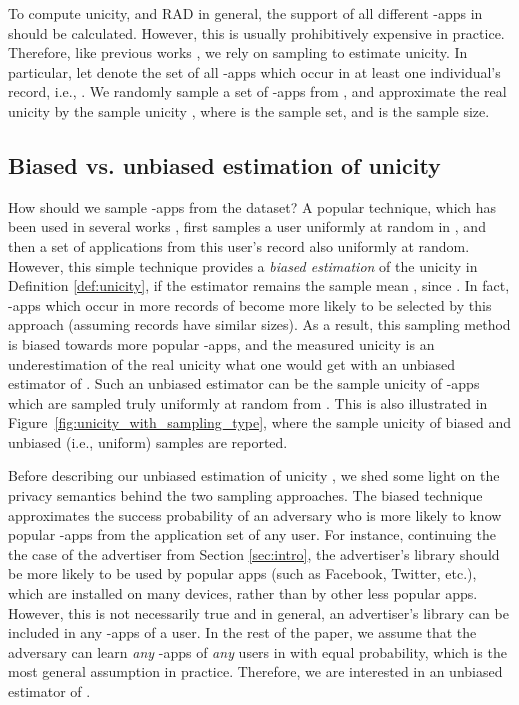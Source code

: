 \documentclass{acm_proc_article-sp}
\theoremstyle{plain}
\theoremstyle{plain}
\theoremstyle{plain}
\theoremstyle{plain}
\theoremstyle{plain}
\theoremstyle{plain}
\begin{document}
To compute unicity, and RAD in general, the support of all different -apps in  should be calculated. 
However, this is usually prohibitively expensive in practice.
Therefore, like previous works \cite{Science15, Nature13}, we rely on sampling to estimate unicity. 
In particular, let  denote the set of all -apps which occur in at least one individual's record, i.e., .
We randomly sample a set  of -apps from , and approximate the real unicity  by the sample unicity , where  is the sample set, and  is the sample size.

\subsection{Biased vs. unbiased estimation of unicity}
\label{sec:biased}
How should we sample -apps from the dataset? A popular technique, which has been used in several works \cite{Science15, Nature13},  first samples a user uniformly at random in , and then a set of  applications from this user's record also uniformly at random. However, this simple technique provides a \emph{biased estimation} of the unicity in Definition \ref{def:unicity}, if the estimator remains the sample mean , since .  
In fact, -apps which occur in more records of  become more likely to be selected by this approach (assuming records have similar sizes). 
As a result, this sampling method is biased towards more popular -apps, and the measured unicity is an underestimation of the real unicity  what one would get with an unbiased estimator of . Such an unbiased estimator can be the sample unicity  of -apps which are sampled truly uniformly at random from . 
This is also illustrated in Figure~\ref{fig:unicity_with_sampling_type}, where the sample unicity of biased and unbiased (i.e., uniform) samples are reported.


Before describing our unbiased estimation of unicity , we shed some light on the privacy semantics behind the two sampling approaches.  
The biased technique approximates the success probability of an adversary who is more likely to know popular -apps from the application set of any user. 
For instance, continuing the the case of the advertiser from Section \ref{sec:intro}, the advertiser's library should be more likely to be used by popular apps (such as Facebook, Twitter, etc.), 
which are installed on many devices, rather than by other less popular apps. 
However, this is not necessarily true and in general, an advertiser's library can be included in any -apps of a user.
In the rest of the paper, we assume that the adversary can learn \emph{any} -apps of \emph{any} users in  with equal probability, which is the most general assumption in practice. 
Therefore, we  are interested in an unbiased estimator of . 
\end{document}

